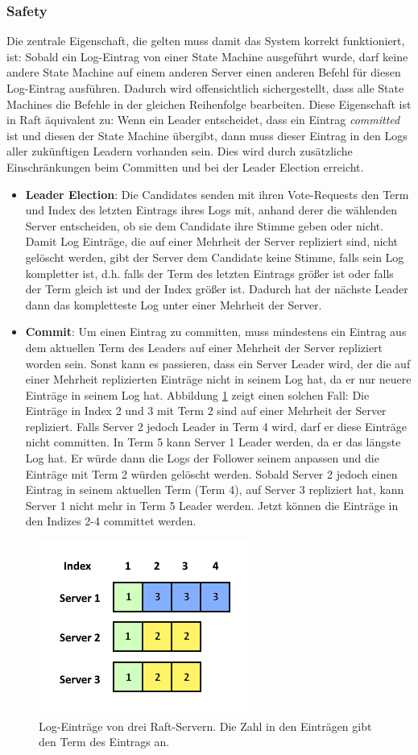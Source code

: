 \subsubsection{Safety}

Die zentrale Eigenschaft, die gelten muss damit das System korrekt funktioniert, ist: Sobald ein Log-Eintrag von einer State Machine ausgeführt wurde, darf keine andere State Machine auf einem anderen Server einen anderen Befehl für diesen Log-Eintrag ausführen. Dadurch wird offensichtlich sichergestellt, dass alle State Machines die Befehle in der gleichen Reihenfolge bearbeiten. Diese Eigenschaft ist in Raft äquivalent zu: Wenn ein Leader entscheidet, dass ein Eintrag \textit{committed} ist und diesen der State Machine übergibt, dann muss dieser Eintrag in den Logs aller zukünftigen Leadern vorhanden sein. Dies wird durch zusätzliche Einschränkungen beim Committen und bei der Leader Election erreicht.

\begin{itemize}
	\item \textbf{Leader Election}: Die Candidates senden mit ihren Vote-Requests den Term und Index des letzten Eintrags ihres Logs mit, anhand derer die wählenden Server entscheiden, ob sie dem Candidate ihre Stimme geben oder nicht. Damit Log Einträge, die auf einer Mehrheit der Server repliziert sind, nicht gelöscht werden, gibt der Server dem Candidate keine Stimme, falls sein Log kompletter ist, d.h. falls der Term des letzten Eintrags größer ist oder falls der Term gleich ist und der Index größer ist. Dadurch hat der nächste Leader dann das kompletteste Log unter einer Mehrheit der Server.
	\item \textbf{Commit}: Um einen Eintrag zu committen, muss mindestens ein Eintrag aus dem aktuellen Term des Leaders auf einer Mehrheit der Server repliziert worden sein. Sonst kann es passieren, dass ein Server Leader wird, der die auf einer Mehrheit replizierten Einträge nicht in seinem Log hat, da er nur neuere Einträge in seinem Log hat. Abbildung \ref{fig:zab} zeigt einen solchen Fall: Die Einträge in Index 2 und 3 mit Term 2 sind auf einer Mehrheit der Server repliziert. Falls Server 2 jedoch Leader in Term 4 wird, darf er diese Einträge nicht committen. In Term 5 kann Server 1 Leader werden, da er das längste Log hat. Er würde dann die Logs der Follower seinem anpassen und die Einträge mit Term 2 würden gelöscht werden. Sobald Server 2 jedoch einen Eintrag in seinem aktuellen Term (Term 4), auf Server 3 repliziert hat, kann Server 1 nicht mehr in Term 5 Leader werden. Jetzt können die Einträge in den Indizes 2-4 committet werden.
\end{itemize}

\begin{figure}[H]
	\centering
	\includegraphics{img/raft-log.png}
	\caption{Log-Einträge von drei Raft-Servern. Die Zahl in den Einträgen gibt den Term des Eintrags an.}
	\label{fig:zab}
\end{figure}